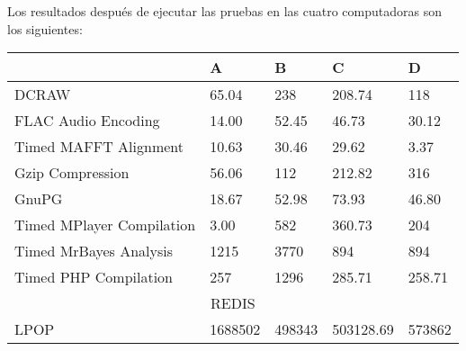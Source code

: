 \documentclass[12pt, letterpaper]{article}
\begin{document}
                        \hspace{.5cm}
                        Los resultados después de ejecutar las pruebas en las cuatro computadoras
                        son los siguientes:\newpage

                        \begin{table}[t]
                                \centering
                                \begin{tabular}{|l|l|l|l|l|}
                                \hline
                                                                 & \hspace{.5cm} \textbf{A} & \hspace{.3cm} \textbf{B} & \hspace{.6cm} \textbf{C} & \hspace{.3cm} \textbf{D} \\ \hline     
                                        \hspace{1.6cm} DCRAW & 65.04 & 238 & 208.74 & 118 \\ \hline
                                        \hspace{.3cm} FLAC Audio Encoding & 14.00 & 52.45 & 46.73 & 30.12 \\ \hline
                                        \hspace{.1cm} Timed MAFFT Alignment & 10.63 & 30.46 & 29.62 & 3.37 \\ \hline
                                        \hspace{.9cm} Gzip Compression & 56.06 & 112 & 212.82 & 316 \\ \hline
                                        \hspace{2cm} GnuPG & 18.67 & 52.98 & 73.93 & 46.80 \\ \hline
                                        \hspace{0cm} Timed MPlayer Compilation & 3.00 & 582 & 360.73 & 204 \\ \hline
                                        \hspace{.2cm} Timed MrBayes Analysis & 1215 & 3770 & 894 & 894\\ \hline
                                        \hspace{.2cm} Timed PHP Compilation & 257 & 1296 & 285.71 & 258.71 \\ \hline \hline
                                        \multicolumn{5}{|c|}{REDIS} \\ \hline
                                        \hspace{1.8cm} LPOP & 1688502  & 498343 & 503128.69 & 573862 \\ \hline

\end{tabular}
\end{table}
\end{document}
